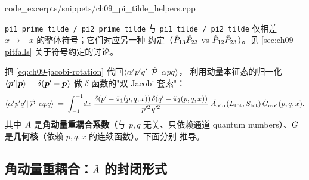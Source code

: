 
{code_excerpts/snippets/ch09_pi_tilde_helpers.cpp}

\begin{remark}
\label{rem:ch09-pi-prime}
\texttt{pi1\_prime\_tilde / pi2\_prime\_tilde} 与
\texttt{pi1\_tilde / pi2\_tilde} 仅相差 \(x\to-x\) 的整体符号；它们对应另一种
约定（\(\hat{P}_{13}\hat{P}_{23}\) vs \(\hat{P}_{12}\hat{P}_{23}\)）。见
\cref{sec:ch09-pitfalls} 关于符号约定的讨论。
\end{remark}

把 \eqref{eq:ch09-jacobi-rotation} 代回\(\bra{\alpha'p'q'}\hat{\mathcal{P}}\ket{\alpha pq}\)，
利用动量本征态的归一化 \(\braket{\boldsymbol{p}'}{\boldsymbol{p}}=\delta(\boldsymbol{p}'-\boldsymbol{p})\)
做 \(\delta\) 函数的"双 Jacobi 套索"：
\begin{equation}
\label{eq:ch09-element-raw}
\bra{\alpha'p'q'}\hat{\mathcal{P}}\ket{\alpha pq}
\;=\;
\int_{-1}^{+1}\!dx\;
\frac{\delta(p' - \tilde{\pi}_{1}(p,q,x))\,\delta(q' - \tilde{\pi}_{2}(p,q,x))}{p'^{2}\,q'^{2}}\;
\tilde{A}_{\alpha'\alpha}(L_{\text{tot}},S_{\text{tot}})\,
\tilde{G}_{\alpha\alpha'}(p,q,x).
\end{equation}
其中 \(\tilde{A}\) 是\textbf{角动量重耦合系数}（与 \(p,q\) 无关、只依赖通道 quantum
numbers）、\(\tilde{G}\) 是\textbf{几何核}（依赖 \(p,q,x\) 的连续函数）。下面分别
推导。

\subsection{角动量重耦合：\texorpdfstring{$\tilde{A}$}{Atilde} 的封闭形式}
\label{subsec:ch09-Atilde}

